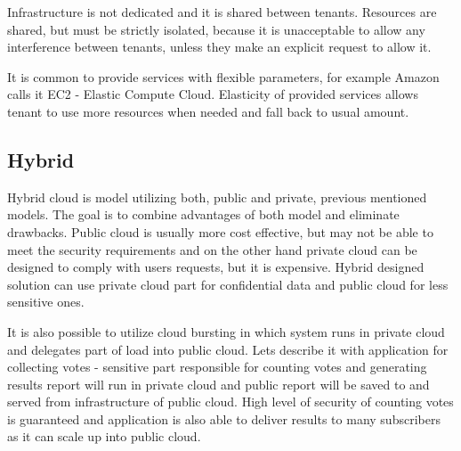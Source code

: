 Infrastructure is not dedicated and it is shared between tenants. Resources are shared, but must be strictly isolated, because it is unacceptable to allow any interference between tenants, unless they make an explicit request to allow it.

It is common to provide services with flexible parameters, for example Amazon calls it EC2 - Elastic Compute Cloud. Elasticity of provided services allows tenant to use more resources when needed and fall back to usual amount. 

\subsection{Hybrid}
Hybrid cloud is model utilizing both, public and private, previous mentioned models. The goal is to combine advantages of both model and eliminate drawbacks. Public cloud is usually more cost effective, but may not be able to meet the security requirements and on the other hand private cloud can be designed to comply with users requests, but it is expensive. Hybrid designed solution can use private cloud part for confidential data and public cloud for less sensitive ones. 

It is also possible to utilize cloud bursting in which system runs in private cloud and delegates part of load into public cloud. Lets describe it with application for collecting votes - sensitive part responsible for counting votes and generating results report will run in private cloud and public report will be saved to and served from infrastructure of public cloud. High level of security of counting votes is guaranteed and application is also able to deliver results to many subscribers as it can scale up into public cloud.

